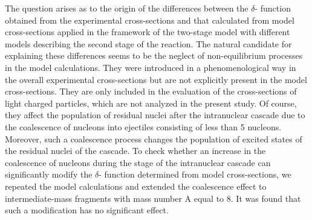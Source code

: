 The question arises as to the origin of the differences between the $\delta$-
function obtained from the experimental cross-sections and that calculated from model cross-sections applied in the framework of the two-stage model with different models describing the second stage of the reaction. The natural candidate for explaining these differences seems to be the neglect of non-equilibrium processes in the model calculations. They were introduced in a phenomenological way in the overall experimental cross-sections but are not explicitly present in the model cross-sections. They are only included in the evaluation of the cross-sections of light charged particles, which are not analyzed in the present study. Of course, they affect the population of residual nuclei after the intranuclear cascade due to the coalescence of nucleons into ejectiles consisting of less than 5 nucleons. Moreover, such a coalescence process changes the population of excited states of the residual nuclei of the cascade.
To check whether an increase in the coalescence of nucleons during the stage of the intranuclear cascade can significantly modify the $\delta$- function determined from model cross-sections, we repeated the model calculations and extended the coalescence effect to intermediate-mass fragments with mass number A equal to 8. It was found that such a modification has no significant effect.
%

